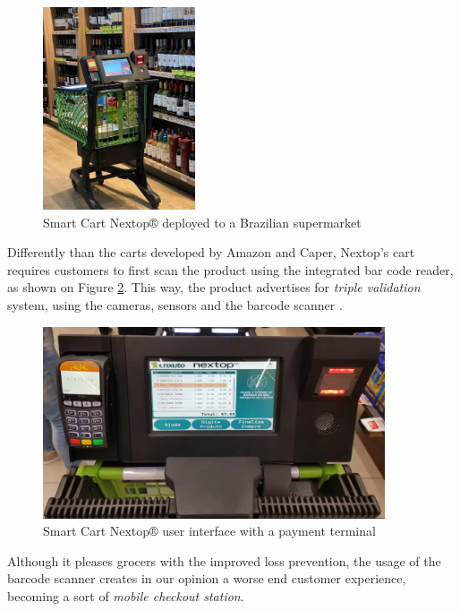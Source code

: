 \documentclass[openright]{normas-utf-tex} %
\begin{document}
\begin{figure}[H]
	\centering
	\includegraphics[width=0.4\textwidth]{./images/nextop.jpeg}
	\caption[Smart Cart Nextop® deployed to a Brazilian supermarket]{Smart Cart Nextop® deployed to a Brazilian supermarket}
	\label{fig:nextop}
\end{figure}

Differently than the carts developed by Amazon and Caper, Nextop's cart
requires customers to first scan the product using the integrated bar code
reader, as shown on Figure \ref{fig:nextopui}. This way, the product advertises for
\textit{triple validation} system, using the cameras, sensors and the barcode scanner \cite{Nextop2022}.

\begin{figure}[H]
	\centering
	\includegraphics[width=0.9\textwidth]{./images/nextop2.png}
    \caption[Smart Cart Nextop® user interface with a payment terminal]{Smart Cart Nextop® user interface with a payment terminal}
	\label{fig:nextopui}
\end{figure}

Although it pleases grocers with the improved loss prevention, the usage of the barcode scanner creates in our opinion a worse
end customer experience, becoming a sort of \textit{mobile checkout station}.
\end{document}
